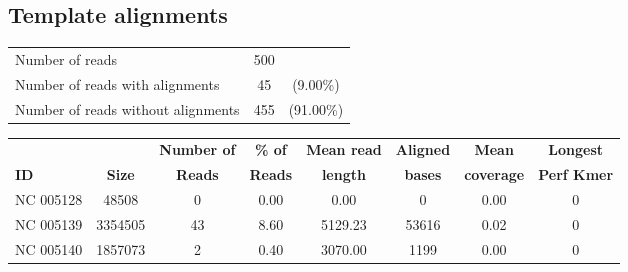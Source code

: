 \documentclass[a4paper,11pt,oneside]{article}
\begin{document}
\subsection*{Template alignments}
\vspace{-3mm}
\begin{table}[H]
{\footnotesize
\fontsize{9pt}{11pt}\selectfont
\begin{tabular}{l c c}
Number of reads & 500 & \\
Number of reads with alignments & 45 & (9.00\%) \\
Number of reads without alignments & 455 & (91.00\%) \\
\end{tabular}
}
\end{table}
\vspace{-10mm}
\begin{table}[H]
{\footnotesize
\fontsize{9pt}{11pt}\selectfont
\begin{tabular}{l c c c c c c c}
          &             & {\bf Number of} & {\bf \% of} & {\bf Mean read} & {\bf Aligned} & {\bf Mean} & {\bf Longest} \\
{\bf ID} & {\bf Size} & {\bf Reads}     & {\bf Reads}  & {\bf length}    & {\bf bases}   & {\bf coverage} & {\bf Perf Kmer} \\
NC 005128 & 48508 & 0 & 0.00 & 0.00 & 0 & 0.00 & 0 \\
NC 005139 & 3354505 & 43 & 8.60 & 5129.23 & 53616 & 0.02 & 0 \\
NC 005140 & 1857073 & 2 & 0.40 & 3070.00 & 1199 & 0.00 & 0 \\
\end{tabular}
}
\end{table}
\end{document}
